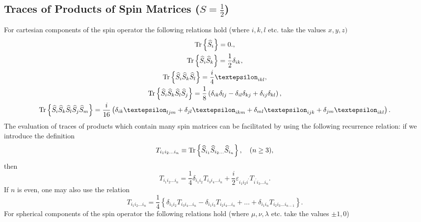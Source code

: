 \subsection{Traces of Products of Spin Matrices ($S=\frac{1}{2}$)}
For cartesian components of the spin operator the following relations hold (where $i, k, l$ etc. take the values $x, y, z)$
\begin{gather}
\Tr \left\{\widehat{S}_{i}\right\}=0 ., \notag\\
\Tr \left\{\widehat{S}_{i} \widehat{S}_{k}\right\}=\frac{1}{2} \delta_{i k} , \notag\\
\Tr \left\{\widehat{S}_{i} \widehat{S}_{k} \widehat{S}_{l}\right\}=\frac{i}{4} \varepsilon_{i k l} , \label{eq:2:5:42}\\
\Tr \left\{\widehat{S}_{i} \widehat{S}_{k} \widehat{S}_{l} \widehat{S}_{j}\right\}=\frac{1}{8}\left(\delta_{i k} \delta_{l j}-\delta_{i l} \delta_{k j}+\delta_{i j} \delta_{k l}\right),  \notag\\
\Tr \left\{\widehat{S}_{i} \widehat{S}_{k} \widehat{S}_{l} \widehat{S}_{j} \widehat{S}_{m}\right\}=\frac{i}{16}\left(\delta_{i k} \varepsilon_{l j m}+\delta_{j l} \varepsilon_{i k m}+\delta_{m l} \varepsilon_{i j k}+\delta_{j m} \varepsilon_{i k l}\right) . \notag
\end{gather}
The evaluation of traces of products which contain many spin matrices can be facilitated by using the following recurrence relation: if we introduce the definition
\begin{equation}
T_{i_{1} i_{2} \ldots i_{n}} \equiv \operatorname{Tr} \left\{\widehat{S}_{i_{1}} \widehat{S}_{i_{2} \ldots} \widehat{S}_{i_{n}}\right\}, \quad(n \geq 3), \label{eq:2:5:43}
\end{equation}
then
\begin{equation}
T_{i_{1} i_{2} \ldots i_{n}}=\frac{1}{4} \delta_{i_{1} i_{2}} T_{i_{3} i_{4} \ldots i_{n}}+\frac{i}{2} \varepsilon_{i_{1} i_{2} i^{\prime}} T_{i^{\prime} i_{3} \ldots i_{n}}. \label{eq:2:5:44}
\end{equation}
If $n$ is even, one may also use the relation
\begin{equation}
T_{i_{1} i_{2} \ldots i_{n}}=\frac{1}{4}\left\{\delta_{i_{1} i_{2}} T_{i_{3} i_{4} \ldots i_{n}}-\delta_{i_{1} i_{3}} T_{i_{2} i_{4} \ldots i_{n}}+\ldots+\delta_{i_{1} i_{n}} T_{i_{2} i_{3} \ldots i_{n-1}}\right\} .\label{eq:2:5:45}
\end{equation}
For spherical components of the spin operator the following relations hold (where $\mu, \nu, \lambda$ etc. take the values $\pm 1,0$)
